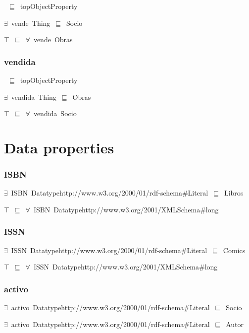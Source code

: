\documentclass{article}
\begin{document}
~\ensuremath{\sqsubseteq}~topObjectProperty

\ensuremath{\exists}~vende~Thing~\ensuremath{\sqsubseteq}~Socio

\ensuremath{\top}~\ensuremath{\sqsubseteq}~\ensuremath{\forall}~vende~Obras

\subsubsection*{vendida}

~\ensuremath{\sqsubseteq}~topObjectProperty

\ensuremath{\exists}~vendida~Thing~\ensuremath{\sqsubseteq}~Obras

\ensuremath{\top}~\ensuremath{\sqsubseteq}~\ensuremath{\forall}~vendida~Socio

\section*{Data properties}\subsubsection*{ISBN}

\ensuremath{\exists}~ISBN~Datatypehttp://www.w3.org/2000/01/rdf-schema#Literal~\ensuremath{\sqsubseteq}~Libros

\ensuremath{\top}~\ensuremath{\sqsubseteq}~\ensuremath{\forall}~ISBN~Datatypehttp://www.w3.org/2001/XMLSchema#long

\subsubsection*{ISSN}

\ensuremath{\exists}~ISSN~Datatypehttp://www.w3.org/2000/01/rdf-schema#Literal~\ensuremath{\sqsubseteq}~Comics

\ensuremath{\top}~\ensuremath{\sqsubseteq}~\ensuremath{\forall}~ISSN~Datatypehttp://www.w3.org/2001/XMLSchema#long

\subsubsection*{activo}

\ensuremath{\exists}~activo~Datatypehttp://www.w3.org/2000/01/rdf-schema#Literal~\ensuremath{\sqsubseteq}~Socio

\ensuremath{\exists}~activo~Datatypehttp://www.w3.org/2000/01/rdf-schema#Literal~\ensuremath{\sqsubseteq}~Autor
\end{document}
